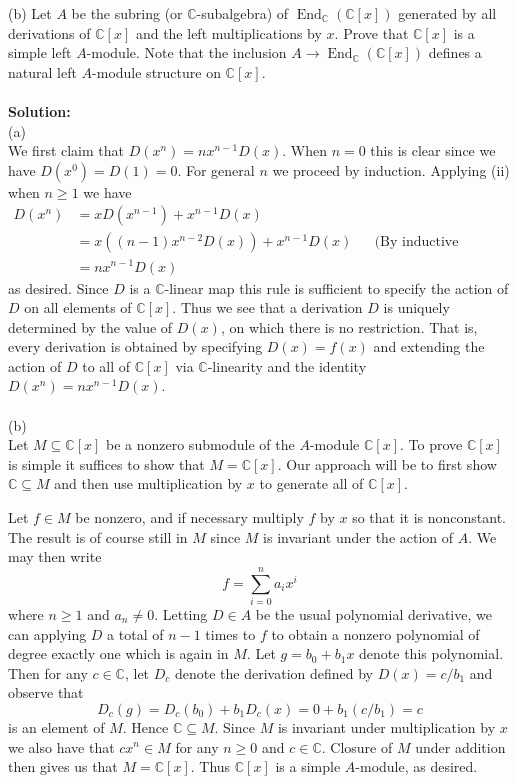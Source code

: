 \documentclass[11pt]{article}
\newcommand{\C}{\mathbb{C}}
\DeclareMathOperator{\End}{End}
\begin{document}
(b) Let $A$ be the subring (or $\C$-subalgebra) of $\End_\C(\C[x])$ generated by all derivations of $\C[x]$ and the left multiplications by $x$. Prove that $\C[x]$ is a simple left $A$-module. Note that the inclusion $A\to \End_\C(\C[x])$ defines a natural left $A$-module structure on $\C[x]$. \\\\
\textbf{Solution:}\\
(a)\\
We first claim that $D(x^n) = nx^{n-1} D(x)$. When $n=0$ this is clear since we have $D(x^0) = D(1) = 0$. For general $n$ we proceed by induction. Applying (ii) when $n\ge 1$ we have \begin{align*}
D(x^n) &= xD(x^{n-1}) + x^{n-1} D(x)\\
& = x((n-1)x^{n-2} D(x)) + x^{n-1} D(x) &&\text{(By inductive hypothesis)}\\
& = n x^{n-1} D(x)
\end{align*}
as desired. Since $D$ is a $\C$-linear map this rule is sufficient to specify the action of $D$ on all elements of $\C[x]$. Thus we see that a derivation $D$ is uniquely determined by the value of $D(x)$, on which there is no restriction. That is, every derivation is obtained by specifying $D(x) = f(x)$ and extending the action of $D$ to all of $\C[x]$ via $\C$-linearity and the identity $D(x^n) = nx^{n-1} D(x)$. \\\\
(b)\\
Let $M\subseteq \C[x]$ be a nonzero submodule of the $A$-module $\C[x]$. To prove $\C[x]$ is simple it suffices to show that $M = \C[x]$. Our approach will be to first show $\C\subseteq M$ and then use multiplication by $x$ to generate all of $\C[x]$.

 Let $f\in M$ be nonzero, and if necessary multiply $f$ by $x$ so that it is nonconstant. The result is of course still in $M$ since $M$ is invariant under the action of $A$. We may then write \[
f = \sum_{i=0}^n a_i x^i
\]
where $n\ge 1$ and $a_n\neq 0$. Letting $D\in A$ be the usual polynomial derivative, we can applying $D$ a total of $n-1$ times to $f$ to obtain a nonzero polynomial of degree exactly one which is again in $M$. Let $g = b_0 + b_1x$ denote this polynomial. Then for any $c\in \C$, let $D_c$ denote the derivation defined by $D(x) = c/b_1$ and observe that \[
D_c(g) = D_c(b_0) + b_1 D_c(x) = 0 + b_1 (c/b_1) = c
\]
is an element of $M$. Hence $\C\subseteq M$. Since $M$ is invariant under multiplication by $x$ we also have that $cx^n\in M$ for any $n\ge 0$ and $c\in \C$. Closure of $M$ under addition then gives us that $M = \C[x]$. Thus $\C[x]$ is a simple $A$-module, as desired. 
\end{document}
